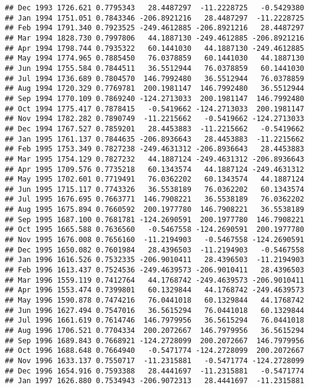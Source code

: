 \documentclass[]{article}
\begin{document}
\begin{verbatim}
## Dec 1993 1726.621 0.7795343   28.4487297  -11.2228725   -0.5429380
## Jan 1994 1751.051 0.7843346 -206.8921216   28.4487297  -11.2228725
## Feb 1994 1791.340 0.7923525 -249.4612885 -206.8921216   28.4487297
## Mar 1994 1828.730 0.7997806   44.1887130 -249.4612885 -206.8921216
## Apr 1994 1798.744 0.7935322   60.1441030   44.1887130 -249.4612885
## May 1994 1774.965 0.7885450   76.0378859   60.1441030   44.1887130
## Jun 1994 1755.584 0.7844511   36.5512944   76.0378859   60.1441030
## Jul 1994 1736.689 0.7804570  146.7992480   36.5512944   76.0378859
## Aug 1994 1720.329 0.7769781  200.1981147  146.7992480   36.5512944
## Sep 1994 1770.109 0.7869240 -124.2713033  200.1981147  146.7992480
## Oct 1994 1775.417 0.7878415   -0.5419662 -124.2713033  200.1981147
## Nov 1994 1782.282 0.7890749  -11.2215662   -0.5419662 -124.2713033
## Dec 1994 1767.527 0.7859201   28.4453883  -11.2215662   -0.5419662
## Jan 1995 1761.137 0.7844635 -206.8936643   28.4453883  -11.2215662
## Feb 1995 1753.349 0.7827238 -249.4631312 -206.8936643   28.4453883
## Mar 1995 1754.129 0.7827232   44.1887124 -249.4631312 -206.8936643
## Apr 1995 1709.576 0.7735218   60.1343574   44.1887124 -249.4631312
## May 1995 1702.601 0.7719491   76.0362202   60.1343574   44.1887124
## Jun 1995 1715.117 0.7743326   36.5538189   76.0362202   60.1343574
## Jul 1995 1676.695 0.7663771  146.7908221   36.5538189   76.0362202
## Aug 1995 1675.894 0.7660592  200.1977780  146.7908221   36.5538189
## Sep 1995 1687.100 0.7681781 -124.2690591  200.1977780  146.7908221
## Oct 1995 1665.588 0.7636560   -0.5467558 -124.2690591  200.1977780
## Nov 1995 1676.008 0.7656160  -11.2194903   -0.5467558 -124.2690591
## Dec 1995 1650.082 0.7601984   28.4396503  -11.2194903   -0.5467558
## Jan 1996 1616.526 0.7532335 -206.9010411   28.4396503  -11.2194903
## Feb 1996 1613.437 0.7524536 -249.4639573 -206.9010411   28.4396503
## Mar 1996 1559.119 0.7412764   44.1768742 -249.4639573 -206.9010411
## Apr 1996 1553.474 0.7399801   60.1329844   44.1768742 -249.4639573
## May 1996 1590.878 0.7474216   76.0441018   60.1329844   44.1768742
## Jun 1996 1627.494 0.7547016   36.5615294   76.0441018   60.1329844
## Jul 1996 1661.619 0.7614746  146.7979956   36.5615294   76.0441018
## Aug 1996 1706.521 0.7704334  200.2072667  146.7979956   36.5615294
## Sep 1996 1689.843 0.7668921 -124.2728099  200.2072667  146.7979956
## Oct 1996 1688.648 0.7664940   -0.5471774 -124.2728099  200.2072667
## Nov 1996 1633.137 0.7550717  -11.2315881   -0.5471774 -124.2728099
## Dec 1996 1654.916 0.7593388   28.4441697  -11.2315881   -0.5471774
## Jan 1997 1626.880 0.7534943 -206.9072313   28.4441697  -11.2315881

\end{verbatim}
\end{document}
